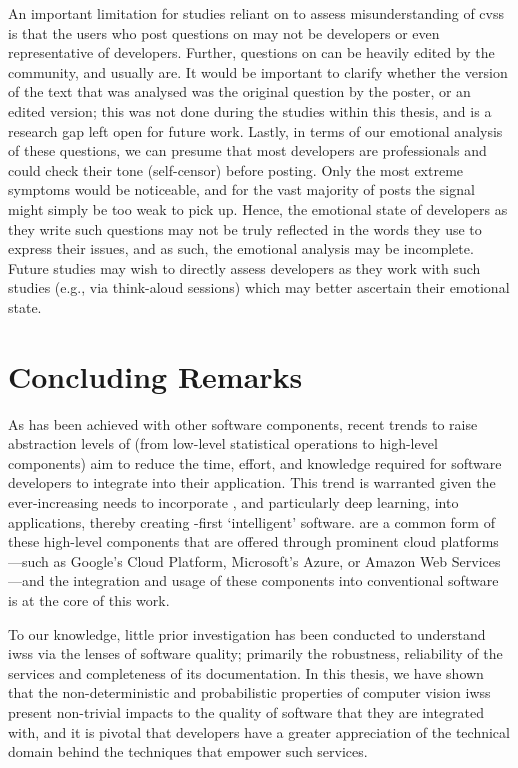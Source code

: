 An important limitation for studies reliant on  to assess misunderstanding of \glspl{cvs} is that the users who post questions on  may not be developers or even representative of developers. Further, questions on  can be heavily edited by the community, and usually are. It would be important to clarify whether the version of the text that was analysed was the original question by the poster, or an edited version; this was not done during the studies within this thesis, and is a research gap left open for future work. Lastly, in terms of our emotional analysis of these questions, we can presume that most developers are professionals and could check their tone (self-censor) before posting. Only the most extreme symptoms would be noticeable, and for the vast majority of posts the signal might simply be too weak to pick up. Hence, the emotional state of developers as they write such questions may not be truly reflected in the words they use to express their issues, and as such, the emotional analysis may be incomplete. Future studies may wish to directly assess developers as they work with such studies (e.g., via think-aloud sessions) which may better ascertain their emotional state.

\section{Concluding Remarks}

As has been achieved with other software components, recent trends to raise abstraction levels of  (from low-level statistical operations to high-level  components) aim to reduce the time, effort, and knowledge required for software developers to integrate  into their application. This trend is warranted given the ever-increasing needs to incorporate , and particularly deep learning, into applications, thereby creating -first `intelligent' software.  are a common form of these high-level  components that are offered through prominent cloud platforms---such as Google's Cloud Platform, Microsoft's Azure, or Amazon Web Services---and the integration and usage of these components into conventional software is at the core of this work.

To our knowledge, little prior investigation has been conducted to understand \glspl{iws} via the lenses of software quality; primarily the robustness, reliability of the services and completeness of its documentation. In this thesis, we have shown that the non-deterministic and probabilistic properties of computer vision \glspl{iws} present non-trivial impacts to the quality of software that they are integrated with, and it is pivotal that developers have a greater appreciation of the technical domain behind the  techniques that empower such services. 

